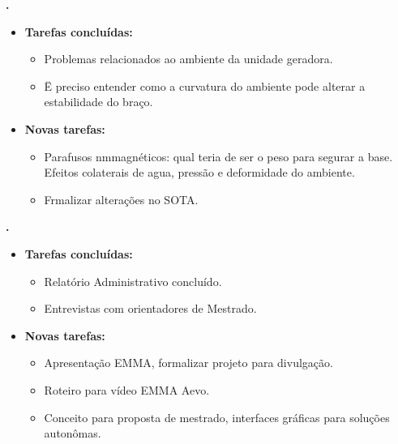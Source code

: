 \textbf{\gabriel.} 
	\begin{itemize}
		\item \textbf{Tarefas concluídas:}
			\begin{itemize}    
				\item Problemas relacionados ao ambiente da unidade geradora.
				\item Ë preciso entender como a curvatura do ambiente pode alterar a
				estabilidade do braço.
			\end{itemize}
		\item \textbf{Novas tarefas:}
			\begin{itemize}
				\item Parafusos nmmagnéticos: qual teria de ser o peso para segurar a base.
				Efeitos colaterais de agua, pressão e deformidade do ambiente.
				\item Frmalizar alterações no SOTA.		
			\end{itemize}
	\end{itemize}
	
\textbf{\julia.} 
	\begin{itemize}
		\item \textbf{Tarefas concluídas:}
			\begin{itemize}    
				\item Relatório Administrativo concluído.
				\item Entrevistas com orientadores de Mestrado. 
			\end{itemize}
		\item \textbf{Novas tarefas:}
			\begin{itemize}
				\item Apresentação EMMA, formalizar  projeto para divulgação.
				\item Roteiro para vídeo EMMA Aevo.
				\item Conceito para proposta de mestrado, interfaces gráficas para soluções
				autonômas.
			\end{itemize}
	\end{itemize}

